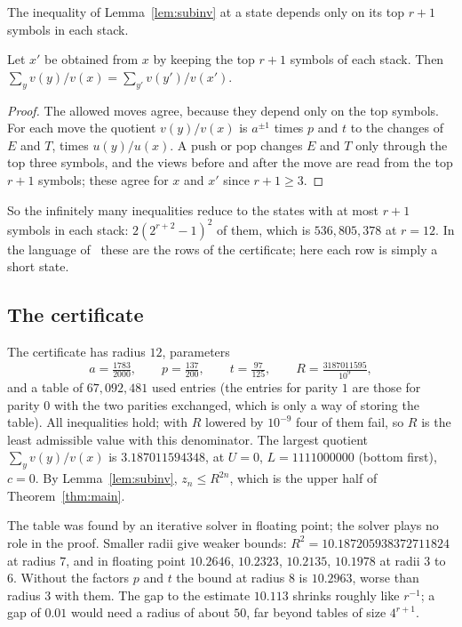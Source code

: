 The inequality of Lemma~\ref{lem:subinv} at a state depends only on its top $r+1$ symbols in each stack.

\begin{lemma}[Truncation]\label{lem:trunc}
Let $x'$ be obtained from $x$ by keeping the top $r+1$ symbols of each stack. Then
$\sum_y v(y)/v(x)=\sum_{y'}v(y')/v(x')$.
\end{lemma}

\begin{proof}
The allowed moves agree, because they depend only on the top symbols. For each move the quotient $v(y)/v(x)$ is
$a^{\pm1}$ times $p$ and $t$ to the changes of $E$ and $T$, times $u(y)/u(x)$. A push or pop changes $E$ and $T$ only
through the top three symbols, and the views before and after the move are read from the top $r+1$ symbols; these
agree for $x$ and $x'$ since $r+1\ge3$.
\end{proof}

So the infinitely many inequalities reduce to the states with at most $r+1$ symbols in each stack:
$2(2^{r+2}-1)^2$ of them, which is $536{,}805{,}378$ at $r=12$. In the language of~\cite{PaperB} these are the rows of
the certificate; here each row is simply a short state.

\subsection{The certificate}

The certificate has radius $12$, parameters
\[ a=\tfrac{1783}{2000},\qquad p=\tfrac{137}{200},\qquad t=\tfrac{97}{125},\qquad R=\tfrac{3187011595}{10^9}, \]
and a table of $67{,}092{,}481$ used entries (the entries for parity $1$ are those for parity $0$ with the two
parities exchanged, which is only a way of storing the table). All inequalities hold; with $R$ lowered by
$10^{-9}$ four of them fail, so $R$ is the least admissible value with this denominator. The largest quotient
$\sum_yv(y)/v(x)$ is $3.187011594348$, at $U=0$, $L=1111000000$ (bottom first), $c=0$. By
Lemma~\ref{lem:subinv}, $z_n\le R^{2n}$, which is the upper half of Theorem~\ref{thm:main}.

The table was found by an iterative solver in floating point; the solver plays no role in the proof. Smaller radii
give weaker bounds: $R^2=10.187205938372711824$ at radius $7$, and in floating point $10.2646$, $10.2323$,
$10.2135$, $10.1978$ at radii $3$ to $6$. Without the factors $p$ and $t$ the bound at radius $8$ is $10.2963$, worse
than radius $3$ with them. The gap to the estimate $10.113$ shrinks roughly like $r^{-1}$; a gap of $0.01$ would
need a radius of about $50$, far beyond tables of size $4^{r+1}$.
